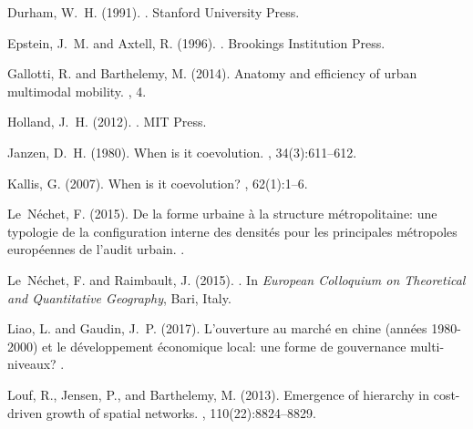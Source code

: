 \documentclass[11pt]{article}
\begin{document}
\begin{thebibliography}{}
Durham, W.~H. (1991).
.
\newblock Stanford University Press.

Epstein, J.~M. and Axtell, R. (1996).
.
\newblock Brookings Institution Press.

Gallotti, R. and Barthelemy, M. (2014).
\newblock Anatomy and efficiency of urban multimodal mobility.
, 4.

Holland, J.~H. (2012).
.
\newblock MIT Press.

Janzen, D.~H. (1980).
\newblock When is it coevolution.
, 34(3):611--612.

Kallis, G. (2007).
\newblock When is it coevolution?
, 62(1):1--6.

Le~N{\'e}chet, F. (2015).
\newblock De la forme urbaine {\`a} la structure m{\'e}tropolitaine: une
  typologie de la configuration interne des densit{\'e}s pour les principales
  m{\'e}tropoles europ{\'e}ennes de l'audit urbain.
.

Le~N{\'e}chet, F. and Raimbault, J. (2015).
.
\newblock In {\em {European Colloquium on Theoretical and Quantitative
  Geography}}, Bari, Italy.

Liao, L. and Gaudin, J.~P. (2017).
\newblock L'ouverture au march{\'e} en chine (ann{\'e}es 1980-2000) et le
  d{\'e}veloppement {\'e}conomique local: une forme de gouvernance
  multi-niveaux?
.

Louf, R., Jensen, P., and Barthelemy, M. (2013).
\newblock Emergence of hierarchy in cost-driven growth of spatial networks.
,
  110(22):8824--8829.


\end{thebibliography}
\end{document}
